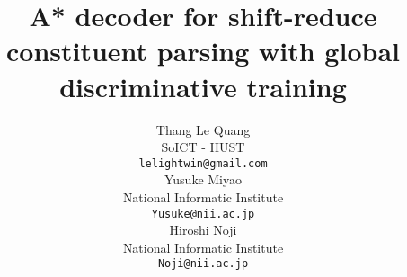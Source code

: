 \documentclass[11pt,letterpaper]{article}
\title{A* decoder for shift-reduce constituent parsing with global discriminative training}
\author{Thang Le Quang \\
  SoICT - HUST\\
  {\tt lelightwin@gmail.com} \\\And
  Yusuke Miyao \\
  National Informatic Institute\\
  {\tt Yusuke@nii.ac.jp} \\\And
  Hiroshi Noji \\
  National Informatic Institute\\
  {\tt Noji@nii.ac.jp} \\}
\begin{document}
\maketitle









{
	
}
\end{document}
